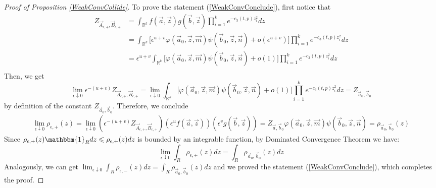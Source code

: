 \begin{proof}[Proof of Proposition \ref{WeakConvCollide}]
To prove the statement (\ref{WeakConvConclude}), first notice that
\begin{align*}
	Z_{\vec{A}_{\epsilon,+},\vec{B}_{\epsilon,+}}&=\int_{\mathbb{R}^{k}}f(\vec{a},\vec{z})g(\vec{b},\vec{z})\prod_{i=1}^{k}e^{-c_{3}(t,p)z^{2}_{i}}dz\\
	&=\int_{\mathbb{R}^{k}}\big[\epsilon^{u+v}\varphi(\vec{a}_{0},\vec{z},\vec{m})\psi(\vec{b}_{0},\vec{z},\vec{n})+o(\epsilon^{u+v})\big]\prod_{i=1}^{k}e^{-c_{3}(t,p)z^{2}_{i}}dz\\
	&=\epsilon^{u+v}\int_{\mathbb{R}^{k}}\big[\varphi(\vec{a}_{0},\vec{z},\vec{m})\psi(\vec{b}_{0},\vec{z},\vec{n})+o(1)\big]\prod_{i=1}^{k}e^{-c_{3}(t,p)z^{2}_{i}}dz\\
\end{align*}
Then, we get
$$\lim_{\epsilon\downarrow 0} \epsilon^{-(u+v)} Z_{\vec{A}_{\epsilon,+},\vec{B}_{\epsilon,+}}=\lim_{\epsilon\downarrow 0}\int_{\mathbb{R}^{k}}\big[\varphi(\vec{a}_{0},\vec{z},\vec{m})\psi(\vec{b}_{0},\vec{z},\vec{n})+o(1)\big]\prod_{i=1}^{k}e^{-c_{3}(t,p)z^{2}_{i}}dz=Z_{\vec{a}_{0},\vec{b}_{0}}$$
by definition of the constant $Z_{\vec{a}_{0},\vec{b}_{0}}$.
Therefore, we conclude
\begin{align*}
	\lim_{\epsilon\downarrow 0}\rho_{\epsilon,+}(z)=\lim_{\epsilon\downarrow 0}(\epsilon^{-(u+v)}Z_{\vec{A}_{\epsilon,+},\vec{B}_{\epsilon,+}})(\epsilon^{u}f(\vec{a},\vec{z}))(\epsilon^{v}g(\vec{b},\vec{z}))=Z_{\vec{a},\vec{b}_{0}}\varphi(\vec{a}_{0},\vec{z},\vec{m})\psi(\vec{b}_{0},\vec{z},\vec{n})=\rho_{\vec{a}_{0},\vec{b}_{0}}(z)
\end{align*}
Since $\rho_{\epsilon,+}(z)\mathbbm{1}_{R}dz\leqslant\rho_{\epsilon,+}(z)dz$ is bounded by an integrable function, by Dominated Convergence Theorem we have: $$\lim_{\epsilon\downarrow 0}\int_{R}\rho_{\epsilon,+}(z)dz=\int_{R}\rho_{\vec{a}_{0},\vec{b}_{0}}(z)dz$$ Analogously, we can get $\lim_{\epsilon\downarrow 0}\int_{R}\rho_{\epsilon,-}(z)dz=\int_{R}\rho_{\vec{a}_{0},\vec{b}_{0}}(z)dz$ and we proved the statement (\ref{WeakConvConclude}), which completes the proof.
\end{proof}
